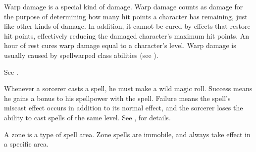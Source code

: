  Warp damage is a special kind of damage.
Warp damage counts as damage for the purpose of determining how many hit points a character has remaining, just like other kinds of damage.
In addition, it cannot be cured by effects that restore hit points, effectively reducing the damaged character's maximum hit points.
An hour of rest cures warp damage equal to a character's level.
Warp damage is usually caused by spellwarped class abilities (see ).

 See .

 Whenever a sorcerer casts a spell, he must make a wild magic roll.
Success means he gains a bonus to his spellpower with the spell.
Failure means the spell's miscast effect occurs in addition to its normal effect, and the sorcerer loses the ability to cast spells of the same level.
See , for details.

 A zone is a type of spell area.
Zone spells are immobile, and always take effect in a specific area.
